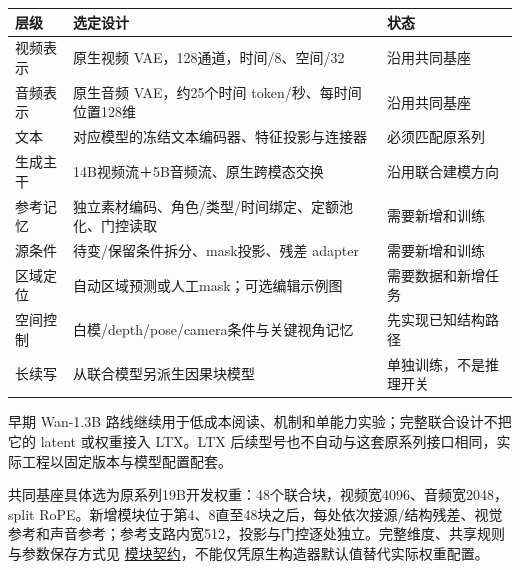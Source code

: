 {\def\LTcaptype{table} %
\small\setlength{\tabcolsep}{3pt}\renewcommand{\arraystretch}{1.18}
\begin{longtable}[]{@{}
  >{\raggedright\arraybackslash}p{}
  >{\raggedright\arraybackslash}p{}
  >{\raggedright\arraybackslash}p{}@{}}
\toprule\noalign{}
\begin{minipage}[b]{\linewidth}\raggedright
层级
\end{minipage} & \begin{minipage}[b]{\linewidth}\raggedright
选定设计
\end{minipage} & \begin{minipage}[b]{\linewidth}\raggedright
状态
\end{minipage} \\
\midrule\noalign{}
\endhead
\bottomrule\noalign{}
\endlastfoot
视频表示 & 原生视频 VAE，128通道，时间/8、空间/32 & 沿用共同基座 \\
音频表示 & 原生音频 VAE，约25个时间 token/秒、每时间位置128维 & 沿用共同基座 \\
文本 & 对应模型的冻结文本编码器、特征投影与连接器 & 必须匹配原系列 \\
生成主干 & 14B视频流＋5B音频流、原生跨模态交换 & 沿用联合建模方向 \\
参考记忆 & 独立素材编码、角色/类型/时间绑定、定额池化、门控读取 & 需要新增和训练 \\
源条件 & 待变/保留条件拆分、mask投影、残差 adapter & 需要新增和训练 \\
区域定位 & 自动区域预测或人工mask；可选编辑示例图 & 需要数据和新增任务 \\
空间控制 & 白模/depth/pose/camera条件与关键视角记忆 & 先实现已知结构路径 \\
长续写 & 从联合模型另派生因果块模型 & 单独训练，不是推理开关 \\
\end{longtable}
}

早期 Wan-1.3B 路线继续用于低成本阅读、机制和单能力实验；完整联合设计不把它的 latent 或权重接入 LTX。LTX 后续型号也不自动与这套原系列接口相同，实际工程以固定版本与模型配置配套。

共同基座具体选为原系列19B开发权重：48个联合块，视频宽4096、音频宽2048，split RoPE。新增模块位于第4、8直至48块之后，每处依次接源/结构残差、视觉参考和声音参考；参考支路内宽512，投影与门控逐处独立。完整维度、共享规则与参数保存方式见 \hyperref[seedance-m21]{模块契约}，不能仅凭原生构造器默认值替代实际权重配置。

